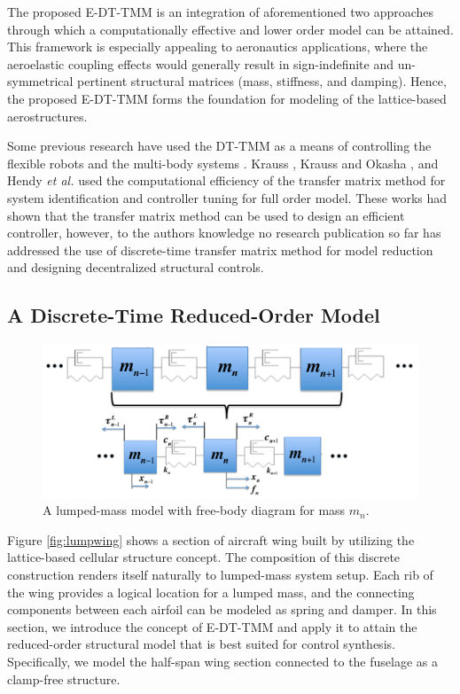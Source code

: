 \documentclass[11pt]{ucthesis}
\begin{document}
The proposed E-DT-TMM is an integration of aforementioned two approaches through which a computationally effective and lower order model can be attained. This framework is especially appealing to aeronautics applications, where the aeroelastic coupling effects would generally result in sign-indefinite and un-symmetrical pertinent structural matrices (mass, stiffness, and damping). Hence, the proposed E-DT-TMM forms the foundation for modeling of the lattice-based aerostructures.
 
Some previous research have used the DT-TMM as a means of controlling the flexible robots \cite{krauss2013discrete, krauss2011computationally} and the multi-body systems  \cite{rong2010discrete,rui2012discrete,hendy2014controller}. Krauss \cite{krauss2011computationally}, Krauss and Okasha \cite{krauss2013discrete}, and Hendy {\it et al.} \cite{hendy2014controller} used the computational efficiency of the transfer matrix method for system identification and controller tuning for full order model. These works had shown that the transfer matrix method can be used to design an efficient controller, however, to the authors knowledge no research publication so far has addressed the use of discrete-time transfer matrix method for model reduction and designing decentralized structural controls.

\subsection{A Discrete-Time Reduced-Order Model}
\label{sec:DTTMM}

\begin{figure}
\centering
\includegraphics[width=1\linewidth]{Figures/full_mass_n.png}
\caption{A lumped-mass model with free-body diagram for mass $m_n$.}
\label{fig:gen}
\end{figure}

Figure \ref{fig:lumpwing} shows a section of aircraft wing built by utilizing the lattice-based cellular structure concept. The composition of this discrete construction renders itself naturally to lumped-mass system setup. Each rib of the wing provides a logical location for a lumped mass, and the connecting components between each airfoil can be modeled as spring and damper. In this section, we introduce the concept of E-DT-TMM and apply it to attain the reduced-order structural model that is best suited for control synthesis. Specifically, we model the half-span wing section connected to the fuselage as a clamp-free structure. 
\end{document}
